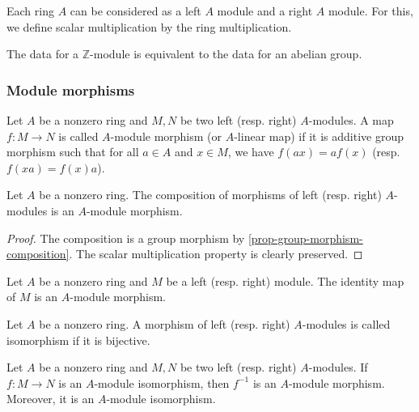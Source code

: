 \documentclass[12pt]{report}
\begin{document}
\begin{remark}
    Each ring $A$ can be considered as a left $A$ module and a right $A$ module. For this, we define scalar multiplication by the ring multiplication.
\end{remark}

\begin{remark}
    The data for a $\mathbb{Z}$-module is equivalent to the data for an abelian group.
\end{remark}

\subsubsection{Module morphisms}

\begin{definition} \label{def-module-morphism}
    Let $A$ be a nonzero ring and $M, N$ be two left (resp. right) $A$-modules. A map $f \colon M \to N$ is called $A$-module morphism (or $A$-linear map) if it is additive group morphism such that for all $a \in A$ and $x \in M$, we have $f(a x) = a f(x)$ (resp. $f(xa) = f(x) a$). 
\end{definition}

\begin{proposition} \label{prop-module-morphism-composition}
    Let $A$ be a nonzero ring. The composition of morphisms of left (resp. right) $A$-modules is an $A$-module morphism.
\end{proposition}

\begin{proof}
    The composition is a group morphism by \ref{prop-group-morphism-composition}. The scalar multiplication property is clearly preserved.
\end{proof}

\begin{remark}
    Let $A$ be a nonzero ring and $M$ be a left (resp. right) module. The identity map of $M$ is an $A$-module morphism.
\end{remark}

\begin{definition} \label{def-module-isomorphism}
    Let $A$ be a nonzero ring. A morphism of left (resp. right) $A$-modules is called isomorphism if it is bijective.
\end{definition}

\begin{proposition} \label{prop-module-morphism-reversibility}
    Let $A$ be a nonzero ring and $M, N$ be two left (resp. right) $A$-modules. If $f \colon M \to N$ is an $A$-module isomorphism, then $f^{-1}$ is an $A$-module morphism. Moreover, it is an $A$-module isomorphism.
\end{proposition}
\end{document}
